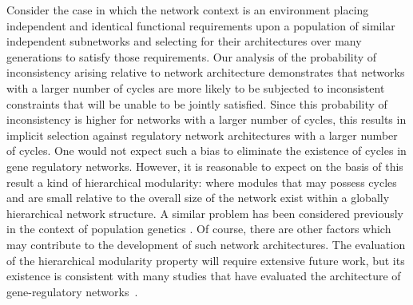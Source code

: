 Consider the case in which the network context is an environment placing independent and identical functional requirements upon a population of similar independent subnetworks and selecting for their architectures over many generations to satisfy those requirements. Our analysis of the probability of inconsistency arising relative to network architecture demonstrates that networks with a larger number of cycles are more likely to be subjected to inconsistent constraints that will be unable to be jointly satisfied. Since this probability of inconsistency is higher for networks with a larger number of cycles, this results in implicit selection against regulatory network architectures with a larger number of cycles. One would not expect such a bias to eliminate the existence of cycles in gene regulatory networks. However, it is reasonable to expect on the basis of this result a kind of hierarchical modularity: where modules that may possess cycles and are small relative to the overall size of the network exist within a globally hierarchical network structure. A similar problem has been considered previously in the context of population genetics \cite{EthanAkin389}. Of course, there are other factors which may contribute to the development of such network architectures. The evaluation of the hierarchical modularity property will require extensive future work, but its existence is consistent with many studies that have evaluated the architecture of gene-regulatory networks~\cite{Ravasz2002,Segre2005,Wagner2007,Erwin2009,Jothi2009,Bhardwaj2010,Chalancon2012,Colm}.

